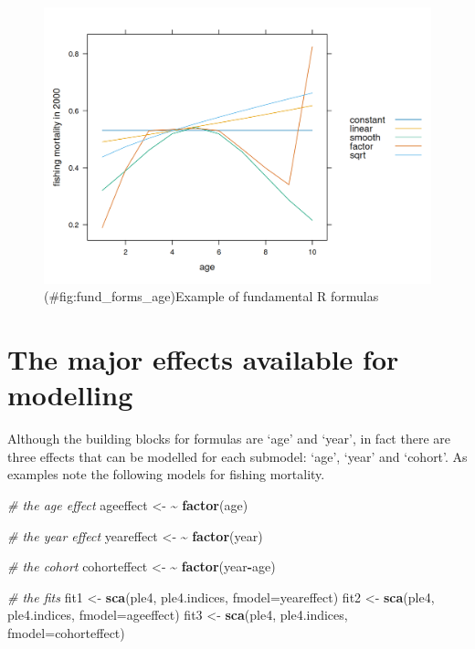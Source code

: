 \documentclass[
]{book}
\newenvironment{Shaded}{\begin{snugshade}}{\end{snugshade}}
\newcommand{\AttributeTok}[1]{\textcolor[rgb]{0.13,0.29,0.53}{#1}}
\newcommand{\CommentTok}[1]{\textcolor[rgb]{0.56,0.35,0.01}{\textit{#1}}}
\newcommand{\ErrorTok}[1]{\textcolor[rgb]{0.64,0.00,0.00}{\textbf{#1}}}
\newcommand{\FunctionTok}[1]{\textcolor[rgb]{0.13,0.29,0.53}{\textbf{#1}}}
\newcommand{\NormalTok}[1]{#1}
\newcommand{\OtherTok}[1]{\textcolor[rgb]{0.56,0.35,0.01}{#1}}
\newcommand{\SpecialCharTok}[1]{\textcolor[rgb]{0.81,0.36,0.00}{\textbf{#1}}}
\begin{document}
\begin{figure}
\centering
\includegraphics{_bookdown_files/_main_files/figure-html/fund_forms_age-1.png}
\caption{(\#fig:fund\_forms\_age)Example of fundamental R formulas}
\end{figure}

\hypertarget{the-major-effects-available-for-modelling}{%
\section{The major effects available for modelling}\label{the-major-effects-available-for-modelling}}

Although the building blocks for formulas are `age' and `year', in fact there are three effects that can be modelled for each submodel: `age', `year' and `cohort'. As examples note the following models for fishing mortality.

\begin{Shaded}
\begin{Highlighting}[]
\CommentTok{\# the age effect}
\NormalTok{ageeffect }\OtherTok{\textless{}{-}} \ErrorTok{\textasciitilde{}} \FunctionTok{factor}\NormalTok{(age)}

\CommentTok{\# the year effect}
\NormalTok{yeareffect }\OtherTok{\textless{}{-}} \ErrorTok{\textasciitilde{}} \FunctionTok{factor}\NormalTok{(year)}

\CommentTok{\# the cohort}
\NormalTok{cohorteffect }\OtherTok{\textless{}{-}} \ErrorTok{\textasciitilde{}} \FunctionTok{factor}\NormalTok{(year}\SpecialCharTok{{-}}\NormalTok{age)}

\CommentTok{\# the fits}
\NormalTok{fit1 }\OtherTok{\textless{}{-}} \FunctionTok{sca}\NormalTok{(ple4, ple4.indices, }\AttributeTok{fmodel=}\NormalTok{yeareffect)}
\NormalTok{fit2 }\OtherTok{\textless{}{-}} \FunctionTok{sca}\NormalTok{(ple4, ple4.indices, }\AttributeTok{fmodel=}\NormalTok{ageeffect)}
\NormalTok{fit3 }\OtherTok{\textless{}{-}} \FunctionTok{sca}\NormalTok{(ple4, ple4.indices, }\AttributeTok{fmodel=}\NormalTok{cohorteffect)}
\end{Highlighting}
\end{Shaded}
\end{document}
